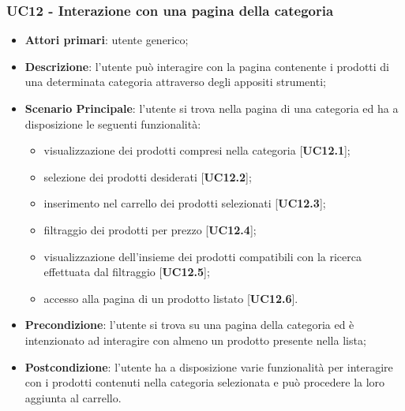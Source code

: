 \subsubsection{UC12 - Interazione con una pagina della categoria}
\begin{itemize}
\item \textbf{Attori primari}: utente generico;
\item \textbf{Descrizione}: l'utente può interagire con la pagina contenente i prodotti di una determinata categoria attraverso degli appositi strumenti;
\item \textbf{Scenario Principale}: l'utente si trova nella pagina di una categoria ed ha a disposizione le seguenti funzionalità:
\begin{itemize}
\item visualizzazione dei prodotti compresi nella categoria [\textbf{UC12.1}];
\item selezione dei prodotti desiderati [\textbf{UC12.2}];
\item inserimento nel carrello dei prodotti selezionati [\textbf{UC12.3}];
\item filtraggio dei prodotti per prezzo [\textbf{UC12.4}];
\item visualizzazione dell'insieme dei prodotti compatibili con la ricerca effettuata dal filtraggio [\textbf{UC12.5}];
\item accesso alla pagina di un prodotto listato [\textbf{UC12.6}].
\end{itemize}
\item \textbf{Precondizione}: l'utente si trova su una pagina della categoria ed è intenzionato ad interagire con almeno un prodotto presente nella lista;
\item \textbf{Postcondizione}: l'utente ha a disposizione varie funzionalità per interagire con i prodotti contenuti nella categoria selezionata e può procedere la loro aggiunta al carrello.
\end{itemize}
